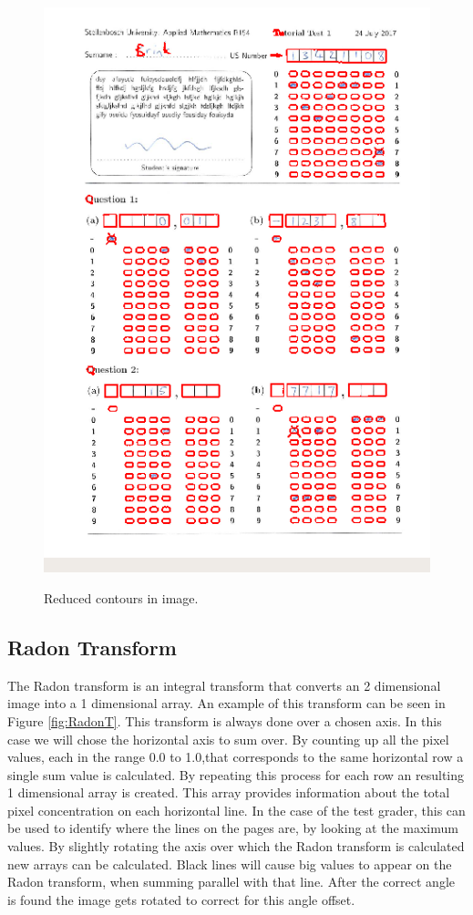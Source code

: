 \begin{figure}
  \centering
  \includegraphics[width=14cm]{Reduced}\\
  \caption{Reduced contours in image.}
  \label{fig:reduced}
\end{figure}

\subsection{Radon Transform}
\label{sec:RadonTransform}

The Radon transform is an integral transform that converts an 2 dimensional image into a 1 dimensional array. An example of this transform can be seen in Figure \ref{fig:RadonT}. This transform is always done over a chosen axis. In this case we will chose the horizontal axis to sum over. By counting up all the pixel values, each in the range 0.0 to 1.0,that corresponds to the same horizontal row a single sum value is calculated. By repeating this process for each row an resulting 1 dimensional array is created. This array provides information about the total pixel concentration on each horizontal line. In the case of the test grader, this can be used to identify where the lines on the pages are, by looking at the maximum values. By slightly rotating the axis over which the Radon transform is calculated new arrays can be calculated. Black lines will cause big values to appear on the Radon transform, when summing parallel with that line. After the correct angle is found the image gets rotated to correct for this angle offset.

